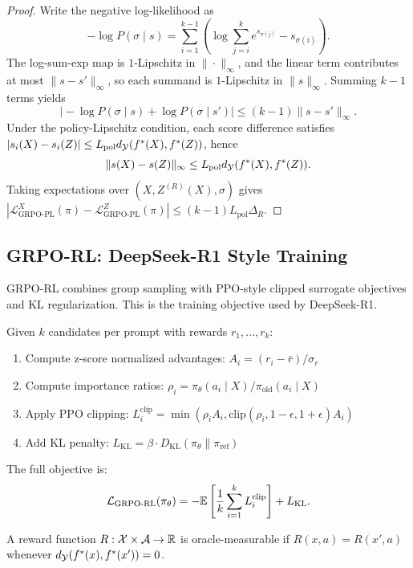 \begin{proof}
Write the negative log-likelihood as
\[
-\log P(\sigma\mid s)=\sum_{i=1}^{k-1}\left(\log\sum_{j=i}^k e^{s_{\sigma(j)}}-s_{\sigma(i)}\right).
\]
The log-sum-exp map is $1$-Lipschitz in $\|\cdot\|_\infty$, and the linear term contributes at most $\|s-s'\|_\infty$, so each summand is $1$-Lipschitz in $\|s\|_\infty$. Summing $k-1$ terms yields
\[
\big|-\log P(\sigma\mid s)+\log P(\sigma\mid s')\big|\le (k-1)\|s-s'\|_\infty.
\]
Under the policy-Lipschitz condition, each score difference satisfies
$|s_i(X)-s_i(Z)|\le L_{\text{pol}}d_{\mathcal{Y}}(f^{\ast}(X),f^{\ast}(Z))$, hence
\[
\|s(X)-s(Z)\|_\infty \le L_{\text{pol}}d_{\mathcal{Y}}(f^{\ast}(X),f^{\ast}(Z)).
\]
Taking expectations over $(X,Z^{(R)}(X),\sigma)$ gives
$|\mathcal{L}_{\text{GRPO-PL}}^X(\pi)-\mathcal{L}_{\text{GRPO-PL}}^Z(\pi)|\le (k-1)L_{\text{pol}}\Delta_R$.
\end{proof}

\subsection{GRPO-RL: DeepSeek-R1 Style Training}

GRPO-RL combines group sampling with PPO-style clipped surrogate objectives and KL regularization. This is the training objective used by DeepSeek-R1.

\begin{definition}
Given $k$ candidates per prompt with rewards $r_1, \ldots, r_k$:
\begin{enumerate}
    \item Compute z-score normalized advantages: $A_i = (r_i - \bar{r}) / \sigma_r$
    \item Compute importance ratios: $\rho_i = \pi_\theta(a_i \mid X) / \pi_{\text{old}}(a_i \mid X)$
    \item Apply PPO clipping: $L_i^{\text{clip}} = \min(\rho_i A_i, \text{clip}(\rho_i, 1-\epsilon, 1+\epsilon) A_i)$
    \item Add KL penalty: $L_{\text{KL}} = \beta \cdot D_{\text{KL}}(\pi_\theta \| \pi_{\text{ref}})$
\end{enumerate}
The full objective is:
\[
\mathcal{L}_{\text{GRPO-RL}}(\pi_\theta) = -\mathbb{E} \left[ \frac{1}{k} \sum_{i=1}^k L_i^{\text{clip}} \right] + L_{\text{KL}}.
\]
\end{definition}

\begin{definition}
A reward function $R: \mathcal{X} \times \mathcal{A} \to \mathbb{R}$ is oracle-measurable if $R(x, a) = R(x', a)$ whenever $d_{\mathcal{Y}}(f^{\ast}(x), f^{\ast}(x')) = 0$.
\end{definition}

